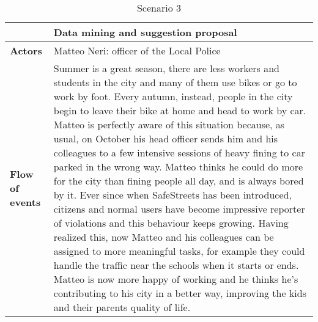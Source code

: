 \begin{table}[!htbp]
	\centering
\begin{tabular}{lp{9cm}}
\hline
\bf\large  &\bf\large Data mining and suggestion proposal\\
\hline
\hline

\bf Actors&Matteo Neri: officer of the Local Police\\
\hline
\bf Flow of events&
Summer is a great season, there are less workers and students in the city and many of them use bikes or go to work by foot.
Every autumn, instead, people in the city begin to leave their bike at home and head to work by car. Matteo is perfectly aware of this situation because, as usual, on October his head officer sends him and his colleagues to a few intensive sessions of heavy fining to car parked in the wrong way. Matteo thinks he could do more for the city than fining people all day, and is always bored by it. Ever since when SafeStreets has been introduced, citizens and normal users have become impressive reporter of violations and this behaviour keeps growing. Having realized this, now Matteo and his colleagues can be assigned to more meaningful tasks, for example they could handle the traffic near the schools when it starts or ends. Matteo is now more happy of working and he thinks he's contributing to his city in a better way, improving the kids and their parents quality of life.
\end{tabular}
\caption{Scenario 3} 
\label{tab:scenariothree}
\end{table}